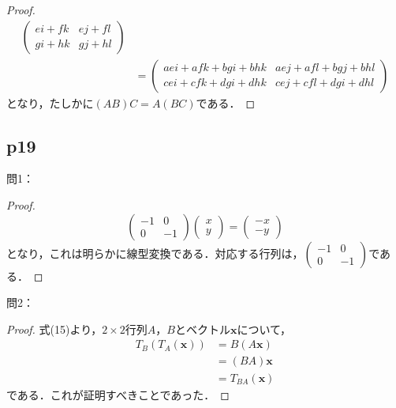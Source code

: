 \documentclass[dvipdfmx,uplatex,11pt]{jsarticle}
\theoremstyle{definition}
\begin{document}
\begin{leftbar}
\begin{proof}
\begin{align*}
\begin{pmatrix}
                    ei + fk & ej +fl \\
                    gi + hk & gj +hl 
                \end{pmatrix}
                \\
                & =
                \begin{pmatrix}
                    aei + afk +bgi +bhk & aej +afl +bgj +bhl \\
                    cei + cfk + dgi +dhk & cej + cfl + dgi +dhl
                \end{pmatrix}
            \end{align*}
            となり，たしかに$(AB)C=A(BC)$である．
        \end{proof}
    \end{leftbar}
%
\newpage
\subsection{p19}
%
問1：
%
\begin{leftbar}
	\begin{proof}
		\[
			\begin{pmatrix}
				-1 & 0\\
				0 & -1
			\end{pmatrix}
			\left(
				\begin{array}{c}
					x \\
					y 
				\end{array}
			\right)
			=
			\left(
				\begin{array}{c}
					-x \\
					-y 
				\end{array}
			\right)
			\]
			となり，これは明らかに線型変換である．対応する行列は，$
			\begin{pmatrix}
				-1 & 0 \\
				0 & -1
			\end{pmatrix}
			$である．
		\end{proof}
	\end{leftbar}
%
	問2：
	\begin{leftbar}
		\begin{proof}
			式(15)より，$2 \times 2$行列$A$，$B$とベクトル$\bm{x}$について，
			\begin{align*}
				T_B (T_A (\bm{x})) &= B(A\bm{x}) \\
				& = (BA) \bm{x} \\
				& = T_{BA} (\bm{x})
			\end{align*}
			である．これが証明すべきことであった．
		\end{proof}
    \end{leftbar}
\end{document}
